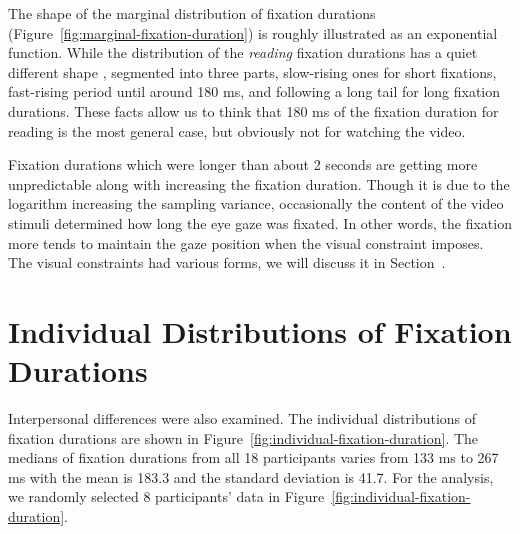 \documentclass[oneside,master]{snueethesis}
\begin{document}
The shape of the marginal distribution of fixation durations (Figure~\ref{fig:marginal-fixation-duration}) is roughly illustrated as an exponential function. While the distribution of the \textit{reading} fixation durations has a quiet different shape \cite{Feng2006}, segmented into three parts, slow-rising ones for short fixations, fast-rising period until around 180 ms, and following a long tail for long fixation durations. These facts allow us to think that 180 ms of the fixation duration for reading is the most general case, but obviously not for watching the video.

Fixation durations which were longer than about 2 seconds are getting more unpredictable along with increasing the fixation duration. Though it is due to the logarithm increasing the sampling variance, occasionally the content of the video stimuli determined how long the eye gaze was fixated. In other words, the fixation more tends to maintain the gaze position when the visual constraint imposes. The visual constraints had various forms, we will discuss it in Section~.


\section{Individual Distributions of Fixation Durations}

Interpersonal differences were also examined. The individual distributions of fixation durations are shown in Figure~\ref{fig:individual-fixation-duration}. The medians of fixation durations from all 18 participants varies from 133 ms to 267 ms with the mean is 183.3 and the standard deviation is 41.7. For the analysis, we randomly selected 8 participants' data in Figure~\ref{fig:individual-fixation-duration}. 
\end{document}
